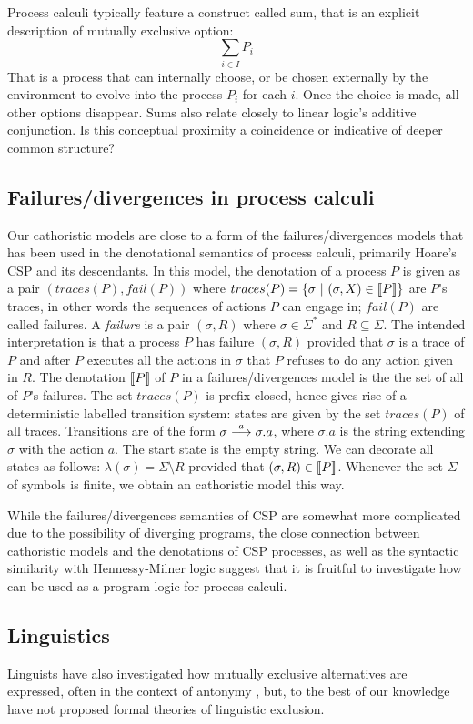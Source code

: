 Process calculi typically feature a construct called sum, that is an
explicit description of mutually exclusive option:
\[
     \sum_{i \in I} P_i
\]
That is a process that can internally choose, or be chosen externally
by the environment to evolve into the process $P_i$ for each $i$. Once
the choice is made, all other options disappear.  Sums also relate
closely to linear logic's additive conjunction. Is this conceptual
proximity a coincidence or indicative of deeper common structure?


\subsection{Failures/divergences in process calculi}

Our cathoristic models are close to a form of the failures/divergences
models that has been used in the denotational semantics of process
calculi, primarily Hoare's CSP \cite{HoareC:comseq,RoscoeAW:theapoc}
and its descendants.  In this model, the denotation of a process $P$
is given as a pair $(traces(P), fail(P))$ where $traces(P) = \{
\sigma\ |\ (\sigma, X) \in \lbrack\!\lbrack P \rbrack\!\rbrack \}$ are $P$'s traces, in other
words the sequences of actions $P$ can engage in; $fail(P)$ are called
failures.  A \emph{failure} is a pair $(\sigma, R)$ where $\sigma \in
\Sigma^*$ and $R \subseteq \Sigma$. The intended interpretation is
that a process $P$ has failure $(\sigma, R)$ provided that $\sigma$ is
a trace of $P$ and after $P$ executes all the actions in $\sigma$ that  $P$
refuses to do any action given in $R$. The denotation $\lbrack\!\lbrack P \rbrack\!\rbrack$ of
$P$ in a failures/divergences model is the the set of all of $P$'s
failures. The set $ traces(P)$ is prefix-closed, hence gives rise of a
deterministic labelled transition system: states are given by the set
$traces(P)$ of all traces.  Transitions are of the form $\sigma
\stackrel{a}{\longrightarrow} \sigma.a$, where $\sigma.a$ is the string extending $\sigma$
with the action $a$.  The start state is the empty string.  We can
decorate all states as follows: $ \lambda (\sigma) = \Sigma \setminus
R $ provided that $(\sigma, R) \in \lbrack\!\lbrack P \rbrack\!\rbrack$.  Whenever the set
$\Sigma$ of symbols is finite, we obtain an cathoristic model this
way.

While the failures/divergences semantics of CSP are somewhat more
complicated due to the possibility of diverging programs, the close
connection between cathoristic models and the denotations of CSP processes,
as well as the syntactic similarity with Hennessy-Milner logic suggest
that it is fruitful to investigate how \cathoristic{} can be used
as a program logic for process calculi.

\subsection{Linguistics}

Linguists have also investigated how mutually exclusive alternatives
are expressed, often in the context of antonymy
\cite{OKeeffeA:rouhanocl,AronoffM:hanlin,AllanK:conencos}, but, to the
best of our knowledge have not proposed formal theories of linguistic
exclusion.

